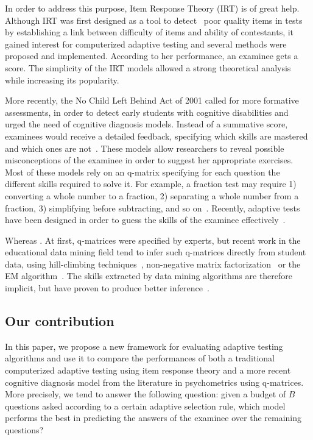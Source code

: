 \documentclass{sig-alternate}
\begin{document}
In order to address this purpose, Item Response Theory (IRT) is of great help. Although IRT was first designed as a tool to detect~\cite{Snif} poor quality items in tests by establishing a link between difficulty of items and ability of contestants, it gained interest for computerized adaptive testing and several methods were proposed and implemented. According to her performance, an examinee gets a score. The simplicity of the IRT models allowed a strong theoretical analysis~\cite{Baker2004} while increasing its popularity.

More recently, the No Child Left Behind Act of 2001 called for more formative assessments, in order to detect early students with cognitive disabilities and urged the need of cognitive diagnosis models. Instead of a summative score, examinees would receive a detailed feedback, specifying which skills are mastered and which ones are not~\cite{Cheng2009}. These models allow researchers to reveal possible misconceptions of the examinee in order to suggest her appropriate exercises. Most of these models rely on an q-matrix specifying for each question the different skills required to solve it. For example, a fraction test may require 1) converting a whole number to a fraction, 2) separating a whole number from a fraction, 3) simplifying before subtracting, and so on~\cite{DeLaTorreDouglas2004}. Recently, adaptive tests have been designed in order to guess the skills of the examinee effectively~\cite{Huebner2010}.

Whereas . At first, q-matrices were specified by experts, but recent work in the educational data mining field tend to infer such q-matrices directly from student data, using hill-climbing techniques~\cite{Barnes2005}, non-negative matrix factorization~\cite{Desmarais2011} or  the EM algorithm~\cite{Huebner2010}. The skills extracted by data mining algorithms are therefore implicit, but have proven to produce better inference~\cite{Barnes2003}.

\subsection{Our contribution}

In this paper, we propose a new framework for evaluating adaptive testing algorithms and use it to compare the performances of both a traditional computerized adaptive testing using item response theory and a more recent cognitive diagnosis model from the literature in psychometrics using q-matrices. More precisely, we tend to answer the following question: given a budget of $B$ questions asked according to a certain adaptive selection rule, which model performs the best in predicting the answers of the examinee over the remaining questions?
\end{document}
